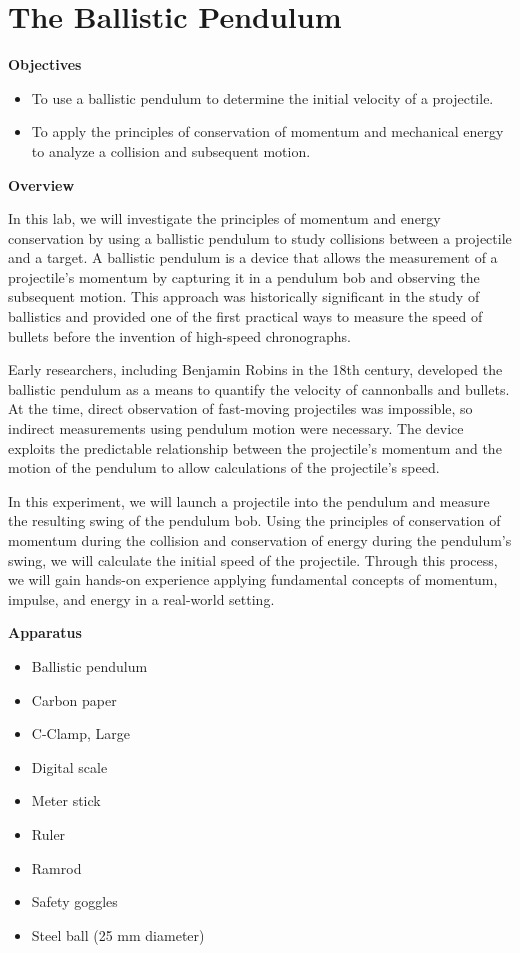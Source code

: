 \section{The Ballistic Pendulum}

\makelabheader %

\textbf{Objectives} 

\begin{itemize}
\item To use a ballistic pendulum to determine the initial velocity of a projectile.
\item To apply the principles of conservation of momentum and mechanical energy to analyze a collision and subsequent motion.
\end{itemize}
\textbf{Overview }

In this lab, we will investigate the principles of momentum and energy conservation by using a ballistic pendulum to study collisions between a projectile and a target. A ballistic pendulum is a device that allows the measurement of a projectile's momentum by capturing it in a pendulum bob and observing the subsequent motion. This approach was historically significant in the study of ballistics and provided one of the first practical ways to measure the speed of bullets before the invention of high-speed chronographs.

Early researchers, including Benjamin Robins in the 18th century, developed the ballistic pendulum as a means to quantify the velocity of cannonballs and bullets. At the time, direct observation of fast-moving projectiles was impossible, so indirect measurements using pendulum motion were necessary. The device exploits the predictable relationship between the projectile's momentum and the motion of the pendulum to allow calculations of the projectile's speed.

In this experiment, we will launch a projectile into the pendulum and measure the resulting swing of the pendulum bob. Using the principles of conservation of momentum during the collision and conservation of energy during the pendulum's swing, we will calculate the initial speed of the projectile. Through this process, we will gain hands-on experience applying fundamental concepts of momentum, impulse, and energy in a real-world setting.

\textbf{Apparatus} 

\begin{itemize}
\item Ballistic pendulum
\item Carbon paper
\item C-Clamp, Large
\item Digital scale
\item Meter stick
\item Ruler
\item Ramrod
\item Safety goggles
\item Steel ball (25 mm diameter)
\end{itemize}

